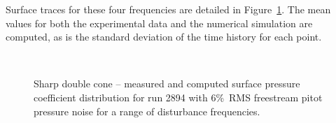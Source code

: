 Surface traces for these four frequencies are detailed in Figure~\ref{fig:double_cone_AEDC_2894_unsteady_6percent_Cpavg}.
The mean values for both the experimental data and the numerical simulation are computed, as is the standard deviation of the time history for each point.
\begin{figure}[hbtp]
  \begin{center}
     \\
    \caption{Sharp double cone -- measured and computed surface pressure coefficient distribution for run 2894 with 6\%~RMS freestream pitot pressure noise for a range of disturbance frequencies.\label{fig:double_cone_AEDC_2894_unsteady_6percent_Cpavg}}
  \end{center}
\end{figure}

